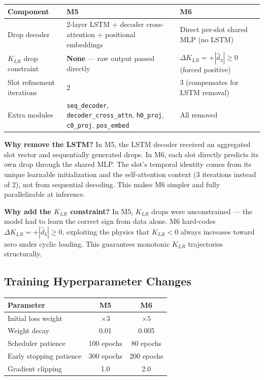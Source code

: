 \documentclass[11pt,a4paper]{article}
\begin{document}
\begin{center}
\small
\begin{tabularx}{\textwidth}{@{}lXX@{}}
\toprule
\textbf{Component} & \textbf{M5} & \textbf{M6} \\
\midrule
Drop decoder & 2-layer LSTM + decoder cross-attention + positional embeddings & Direct per-slot shared MLP (no LSTM) \\
$K_{LR}$ drop constraint & \textbf{None} --- raw output passed directly & $\Delta K_{LR} = +|\hat{d}_3| \geq 0$ (forced positive) \\
Slot refinement iterations & 2 & 3 (compensates for LSTM removal) \\
Extra modules & \texttt{seq\_decoder}, \texttt{decoder\_cross\_attn}, \texttt{h0\_proj}, \texttt{c0\_proj}, \texttt{pos\_embed} & All removed \\
\bottomrule
\end{tabularx}
\end{center}

\textbf{Why remove the LSTM?} In M5, the LSTM decoder received an aggregated slot vector and sequentially generated drops. In M6, each slot directly predicts its own drop through the shared MLP. The slot's temporal identity comes from its unique learnable initialization and the self-attention context (3 iterations instead of 2), not from sequential decoding. This makes M6 simpler and fully parallelizable at inference.

\textbf{Why add the $K_{LR}$ constraint?} In M5, $K_{LR}$ drops were unconstrained --- the model had to learn the correct sign from data alone. M6 hard-codes $\Delta K_{LR} = +|\hat{d}_3| \geq 0$, exploiting the physics that $K_{LR} < 0$ always increases toward zero under cyclic loading. This guarantees monotonic $K_{LR}$ trajectories structurally.

\subsection{Training Hyperparameter Changes}

\begin{center}
\small
\begin{tabular}{@{}lcc@{}}
\toprule
\textbf{Parameter} & \textbf{M5} & \textbf{M6} \\
\midrule
Initial loss weight & $\times 3$ & $\times 5$ \\
Weight decay & 0.01 & 0.005 \\
Scheduler patience & 100 epochs & 80 epochs \\
Early stopping patience & 300 epochs & 200 epochs \\
Gradient clipping & 1.0 & 2.0 \\
\bottomrule
\end{tabular}
\end{center}
\end{document}
